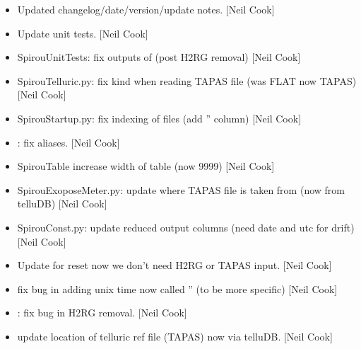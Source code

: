 \documentclass[a4paper,10pt,english]{report}
\begin{document}
\begin{itemize}
\item {} 
Updated changelog/date/version/update notes. {[}Neil Cook{]}

\item {} 
Update unit tests. {[}Neil Cook{]}

\item {} 
SpirouUnitTests: fix outputs of  (post H2RG removal) {[}Neil
Cook{]}

\item {} 
SpirouTelluric.py: fix kind when reading TAPAS file (was FLAT now
TAPAS) {[}Neil Cook{]}

\item {} 
SpirouStartup.py: fix indexing of files (add ” column)
{[}Neil Cook{]}

\item {} 
: fix aliases. {[}Neil Cook{]}

\item {} 
SpirouTable \sphinxhyphen{} increase width of table (now 9999) {[}Neil Cook{]}

\item {} 
SpirouExoposeMeter.py: update where TAPAS file is taken from (now from
telluDB) {[}Neil Cook{]}

\item {} 
SpirouConst.py: update reduced output columns (need date and utc for
drift) {[}Neil Cook{]}

\item {} 
Update  for reset \sphinxhyphen{} now we don’t need H2RG or
TAPAS input. {[}Neil Cook{]}

\item {} 
 \sphinxhyphen{} fix bug in adding unix time \sphinxhyphen{} now
called ” (to be more specific) {[}Neil Cook{]}

\item {} 
: fix bug in H2RG removal. {[}Neil Cook{]}

\item {} 
 \sphinxhyphen{} update location of telluric ref
file (TAPAS) now via telluDB. {[}Neil Cook{]}

\end{itemize}
\end{document}
